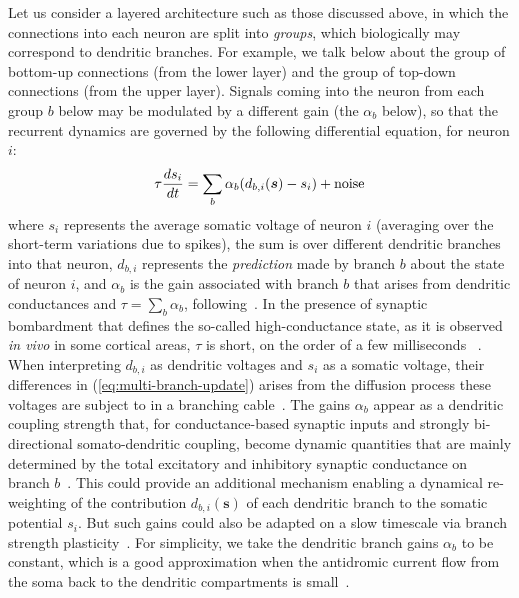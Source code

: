 \documentclass{article}
\newcommand   \vs{{\bm s}}
\begin{document}
Let us consider a layered architecture such as those discussed above,
in which the connections into each neuron are split into {\em groups},
which biologically may correspond to dendritic branches. For example,
we talk below about the group of bottom-up connections (from the lower layer)
and the group of top-down connections (from the upper layer).
Signals coming into the neuron from each group $b$ below may be modulated by
a different gain (the $\alpha_b$ below), so that
the recurrent dynamics are governed by the following differential
equation, for neuron $i$:
\begin{equation}
  \label{eq:multi-branch-update}
  \tau \frac{ds_i}{dt} = \sum_b \alpha_b (d_{b,i}(\vs) - s_i) + {\rm noise}
\end{equation}
where $s_i$ represents the average somatic voltage of neuron $i$ (averaging
over the short-term variations due to spikes),
the sum is over different dendritic branches into that neuron,
$d_{b,i}$ represents the {\em prediction} made by branch $b$ about the
state of neuron $i$, and $\alpha_b$ is the gain associated
with branch $b$ that arises from dendritic conductances
and $\tau = \sum_b \alpha_b$, following~\citet{Urbanczik+Senn-2014}. In the presence of synaptic bombardment that defines the so-called high-conductance state, as it is observed {\em in vivo} in some cortical areas, $\tau$ is short, on the order of a few milliseconds ~\citep{Destexhe2003}. When interpreting $d_{b,i}$ as dendritic voltages and
$s_i$ as a somatic voltage, their differences in (\ref{eq:multi-branch-update}) arises from the diffusion process these voltages are subject to in a branching cable~\citep{Koch2004}. The gains $\alpha_b$ appear as a dendritic coupling strength that, for conductance-based synaptic inputs and strongly bi-directional somato-dendritic coupling, become dynamic quantities that are mainly determined by the total excitatory and inhibitory synaptic conductance on branch $b$~\citep{Sacramento2016}. This could provide an additional mechanism
enabling a dynamical re-weighting of the contribution $d_{b,i}(\vs)$ of each dendritic branch to the somatic potential $s_i$. But such gains could also be
adapted on a slow timescale via branch strength plasticity~\citep{Losonczy2008}.
For simplicity, we take the dendritic branch gains $\alpha_b$ to be constant, which is a good approximation when the antidromic current flow from
the soma back to the dendritic compartments is small~\citep{Urbanczik+Senn-2014}.
\end{document}
